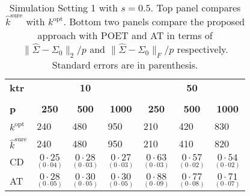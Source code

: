 \documentclass[11pt,oneside]{amsart}
\begin{document}
\begin{table}[htbp!] 
\centering
\footnotesize
\caption{Simulation Setting 1 with $s = 0.5$. Top panel compares $\widehat{k}^{\text{sure}}$ with $k^{\text{opt}}$. Bottom two panels compare the proposed approach with POET and AT in terms of $\|{\widehat{\Sigma}} - {\Sigma_0}\|_{2}/p$ and $\|{\widehat{\Sigma}} - {\Sigma_0}\|_{F}/p$ respectively. Standard errors are in parenthesis.} \label{table1}
\begin{multicols}{7}
\centering
\begin{tabular}{|p{1.92cm}|p{1.92cm}|p{1.92cm}|p{1.92cm}|p{1.92cm}|p{1.92cm}|p{1.92cm}|} \toprule
{\bf ktr} & \multicolumn{3}{c}{{\bf{10}}}& \multicolumn{3}{c|}{{\bf{50}}} \\
\cmidrule(lr){2-4} \cmidrule(lr){5-7} \\
{\bf p} & \multicolumn{1}{c}{{\bf 250}} & \multicolumn{1}{c}{{\bf 500}} & \multicolumn{1}{c}{{\bf 1000}} & \multicolumn{1}{c}{{\bf 250}} & \multicolumn{1}{c}{{\bf 500}} & \multicolumn{1}{c|}{{\bf 1000}}\\
\hline\noalign{\smallskip}
${k^{\text{opt}}}$ & 240 & 480 & 950 & 210 & 420 & 830 \\  
${\widehat{k}}^{\text{sure}}$ & 240 & 480 & 950 & 210 & 410 & 820 \\  \hline \hline 
CD & ${\underset{(0\cdot04)}{0\cdot25}}$ & ${\underset{(0\cdot03)}{0\cdot28}}$ & ${\underset{(0\cdot03)}{0\cdot27}}$ & ${\underset{(0\cdot03)}{0\cdot63}}$ & ${\underset{(0\cdot02)}{0\cdot57}}$ & ${\underset{(0\cdot02)}{0\cdot54}}$ \\  
AT & ${\underset{(0\cdot05)}{0\cdot28}}$ & ${\underset{(0\cdot05)}{0\cdot30}}$ & ${\underset{(0\cdot05)}{0\cdot30}}$ & ${\underset{(0\cdot09)}{0\cdot88}}$ & ${\underset{(0\cdot08)}{0\cdot77}}$ & ${\underset{(0\cdot07)}{0\cdot71}}$ \\ 

\end{tabular}
\end{multicols}
\end{table}
\end{document}
